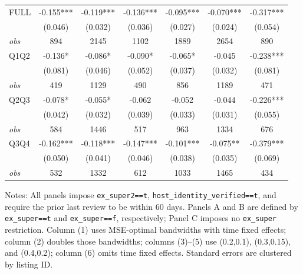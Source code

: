 \begin{table}[!htbp]
\begin{tabular}{lcccccc}
FULL & -0.155*** & -0.119*** & -0.136*** & -0.095*** & -0.070*** & -0.317*** \\
 & (0.046) & (0.032) & (0.036) & (0.027) & (0.024) & (0.054) \\
\textit{obs} & 894 & 2145 & 1102 & 1889 & 2654 & 890 \\
Q1Q2 & -0.136* & -0.086* & -0.090* & -0.065* & -0.045 & -0.238*** \\
 & (0.081) & (0.046) & (0.052) & (0.037) & (0.032) & (0.081) \\
\textit{obs} & 419 & 1129 & 490 & 856 & 1189 & 471 \\
Q2Q3 & -0.078* & -0.055* & -0.062 & -0.052 & -0.044 & -0.226*** \\
 & (0.042) & (0.032) & (0.039) & (0.033) & (0.031) & (0.055) \\
\textit{obs} & 584 & 1446 & 517 & 963 & 1334 & 676 \\
Q3Q4 & -0.162*** & -0.118*** & -0.147*** & -0.101*** & -0.075** & -0.379*** \\
 & (0.050) & (0.041) & (0.046) & (0.038) & (0.035) & (0.069) \\
\textit{obs} & 532 & 1332 & 612 & 1033 & 1465 & 434 \\
\bottomrule
\end{tabular}
\begin{minipage}{0.98\textwidth}\footnotesize
Notes: All panels impose \texttt{ex\_super2==t}, \texttt{host\_identity\_verified==t}, and require the prior last review to be within 60 days. Panels A and B are defined by \texttt{ex\_super==t} and \texttt{ex\_super==f}, respectively; Panel C imposes no \texttt{ex\_super} restriction. Column (1) uses MSE-optimal bandwidths with time fixed effects; column (2) doubles those bandwidths; columns (3)--(5) use (0.2,0.1), (0.3,0.15), and (0.4,0.2); column (6) omits time fixed effects. Standard errors are clustered by listing ID.
\end{minipage}
\end{table}
